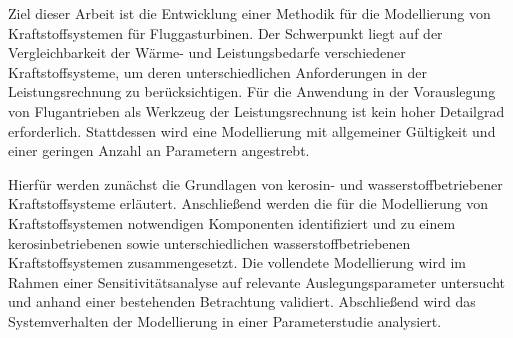 Ziel dieser Arbeit ist die Entwicklung einer Methodik für die Modellierung von Kraftstoffsystemen für Fluggasturbinen. Der Schwerpunkt liegt auf der Vergleichbarkeit der Wärme- und Leistungsbedarfe verschiedener Kraftstoffsysteme, um deren unterschiedlichen Anforderungen in der Leistungsrechnung zu berücksichtigen. Für die Anwendung in der Vorauslegung von Flugantrieben als Werkzeug der Leistungsrechnung ist kein hoher Detailgrad erforderlich. Stattdessen wird eine Modellierung mit allgemeiner Gültigkeit und einer geringen Anzahl an Parametern angestrebt.

Hierfür werden zunächst die Grundlagen von kerosin- und wasserstoffbetriebener Kraftstoffsysteme erläutert. Anschließend werden die für die Modellierung von Kraftstoffsystemen notwendigen Komponenten identifiziert und zu einem kerosinbetriebenen sowie unterschiedlichen wasserstoffbetriebenen Kraftstoffsystemen zusammengesetzt. Die vollendete Modellierung wird im Rahmen einer Sensitivitätsanalyse auf relevante Auslegungsparameter untersucht und anhand einer bestehenden Betrachtung validiert. Abschließend wird das Systemverhalten der Modellierung in einer Parameterstudie analysiert.